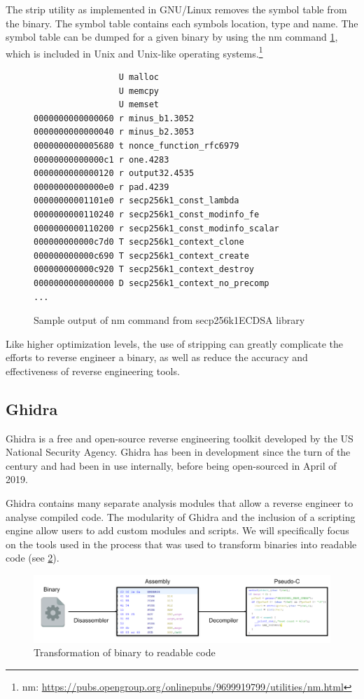 The strip utility as implemented in GNU/Linux removes the symbol table from the binary. The symbol table contains each symbols location, type and name. The symbol table can be dumped for a given binary by using the nm command \ref{fig:nm}, which is included in Unix and Unix-like operating systems.\footnote{nm: \url{https://pubs.opengroup.org/onlinepubs/9699919799/utilities/nm.html}}

\begin{figure}[tbh]
  \centering
\begin{verbatim}
                 U malloc
                 U memcpy
                 U memset
0000000000000060 r minus_b1.3052
0000000000000040 r minus_b2.3053
0000000000005680 t nonce_function_rfc6979
00000000000000c1 r one.4283
0000000000000120 r output32.4535
00000000000000e0 r pad.4239
00000000001101e0 r secp256k1_const_lambda
0000000000110240 r secp256k1_const_modinfo_fe
0000000000110200 r secp256k1_const_modinfo_scalar
000000000000c7d0 T secp256k1_context_clone
000000000000c690 T secp256k1_context_create
000000000000c920 T secp256k1_context_destroy
0000000000000000 D secp256k1_context_no_precomp
...
\end{verbatim}
  \caption[secp256k1]{Sample output of nm command from secp256k1\footnotemark ECDSA library}
  \label{fig:nm}
\end{figure}

Like higher optimization levels, the use of stripping can greatly complicate the efforts to reverse engineer a binary, as well as reduce the accuracy and effectiveness of reverse engineering tools. 
\newpage
\subsection{Ghidra}
Ghidra is a free and open-source reverse engineering toolkit developed by the US National Security Agency. Ghidra has been in development since the turn of the century and had been in use internally, before being open-sourced in April of 2019. 

Ghidra contains many separate analysis modules that allow a reverse engineer to analyse compiled code. The modularity of Ghidra and the inclusion of a scripting engine allow users to add custom modules and scripts. We will specifically focus on the tools used in the process that was used to transform binaries into readable code (see \ref{fig:ghidra}).


\begin{figure}[!h]
  \centering
  \includegraphics[width=\linewidth]{img/ghidra.png}
  \caption{Transformation of binary to readable code}
  \label{fig:ghidra}
\end{figure}

